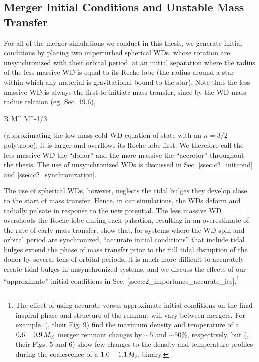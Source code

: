 \subsection{Merger Initial Conditions and Unstable Mass Transfer}
\label{ssec:c1_stable_mass_transfer}

For all of the merger simulations we conduct in this thesis, we generate initial conditions by placing two unperturbed spherical WDs, whose rotation are unsynchronized with their orbital period, at an initial separation where the radius of the less massive WD is equal to its Roche lobe (the radius around a star within which any material is gravitational bound to the star).  Note that the less massive WD is always the first to initiate mass transfer, since by the WD mass-radius relation (eg. \citealt{kippww12} Sec. 19.6),

\eqbegin
R \propto M^{} \approx M^{-1/3}
\label{eq:c1_massradiusrelation}
\eqend

\noindent (approximating the low-mass cold WD equation of state with an $n = 3/2$ polytrope), it is larger and overflows its Roche lobe first.  We therefore call the less massive WD the ``donor'' and the more massive the ``accretor'' throughout the thesis.  The use of unsynchronized WDs is discussed in Sec. \ref{ssec:c2_initcond} and \ref{ssec:c2_synchronization}.  


The use of spherical WDs, however, neglects the tidal bulges they develop close to the start of mass transfer.  Hence, in our simulations, the WDs deform and radially pulsate in response to the new potential.  The less massive WD overshoots the Roche lobe during each pulsation, resulting in an overestimate of the rate of early mass transfer.  \cite{dan+11} show that, for systems where the WD spin and orbital period are synchronized, ``accurate initial conditions'' that include tidal bulges extend the phase of mass transfer prior to the full tidal disruption of the donor by several tens of orbital periods.  It is much more difficult to accurately create tidal bulges in unsynchronized systems, and we discuss the effects of our ``approximate'' initial conditions in Sec. \ref{ssec:c2_importance_accurate_ics}.\footnote{The effect of using accurate versus approximate initial conditions on the final inspiral phase and structure of the remnant will vary between mergers.  For example, \citeauthor{dan+11} (\citeyear{dan+11}, their Fig. 9) find the maximum density and temperature of a $0.6-0.9\,\Msun$ merger remnant changes by $\sim5$ and $\sim50$\%, respectively, but \citeauthor{pakm+12sph} (\citeyear{pakm+12sph}, their Figs. 5 and 6) show few changes to the density and temperature profiles during the coalescence of a $1.0 - 1.1\,\Msun$ binary.}

